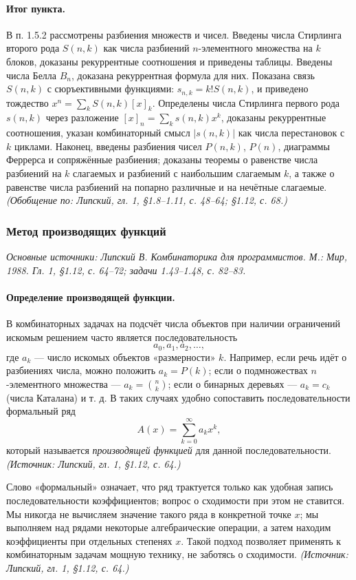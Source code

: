 \documentclass[a4paper,12pt]{article}
\begin{document}
\paragraph{Итог пункта.}
В п. 1.5.2 рассмотрены разбиения множеств и чисел. Введены числа Стирлинга второго рода \(S(n,k)\) как числа разбиений \(n\)-элементного множества на \(k\) блоков, доказаны рекуррентные соотношения и приведены таблицы. Введены числа Белла \(B_n\), доказана рекуррентная формула для них. Показана связь \(S(n,k)\) с сюръективными функциями: \(s_{n,k}=k!S(n,k)\), и приведено тождество \(x^n=\sum_k S(n,k)[x]_k\). Определены числа Стирлинга первого рода \(s(n,k)\) через разложение \([x]_n=\sum_k s(n,k)x^k\), доказаны рекуррентные соотношения, указан комбинаторный смысл \(|s(n,k)|\) как числа перестановок с \(k\) циклами. Наконец, введены разбиения чисел \(P(n,k)\), \(P(n)\), диаграммы Феррерса и сопряжённые разбиения; доказаны теоремы о равенстве числа разбиений на \(k\) слагаемых и разбиений с наибольшим слагаемым \(k\), а также о равенстве числа разбиений на попарно различные и на нечётные слагаемые.
\textit{(Обобщение по: Липский, гл. 1, §1.8--1.11, с. 48--64; §1.12, с. 68.)}

\subsubsection{Метод производящих функций}

\noindent\textit{Основные источники: Липский В. Комбинаторика для программистов. М.: Мир, 1988. Гл. 1, §1.12, с. 64--72; задачи 1.43--1.48, с. 82--83.}

\paragraph{Определение производящей функции.}
В комбинаторных задачах на подсчёт числа объектов при наличии ограничений искомым решением часто является последовательность
\[
a_0,a_1,a_2,\dots,
\]
где \(a_k\) — число искомых объектов «размерности» \(k\). Например, если речь идёт о разбиениях числа, можно положить \(a_k=P(k)\); если о подмножествах \(n\)-элементного множества --- \(a_k=\binom{n}{k}\); если о бинарных деревьях --- \(a_k=c_k\) (числа Каталана) и т. д. В таких случаях удобно сопоставить последовательности формальный ряд
\[
A(x)=\sum_{k=0}^{\infty}a_kx^k,
\]
который называется \emph{производящей функцией} для данной последовательности.
\textit{(Источник: Липский, гл. 1, §1.12, с. 64.)}

Слово «формальный» означает, что ряд трактуется только как удобная запись последовательности коэффициентов; вопрос о сходимости при этом не ставится. Мы никогда не вычисляем значение такого ряда в конкретной точке \(x\); мы выполняем над рядами некоторые алгебраические операции, а затем находим коэффициенты при отдельных степенях \(x\). Такой подход позволяет применять к комбинаторным задачам мощную технику, не заботясь о сходимости.
\textit{(Источник: Липский, гл. 1, §1.12, с. 64.)}
\end{document}
